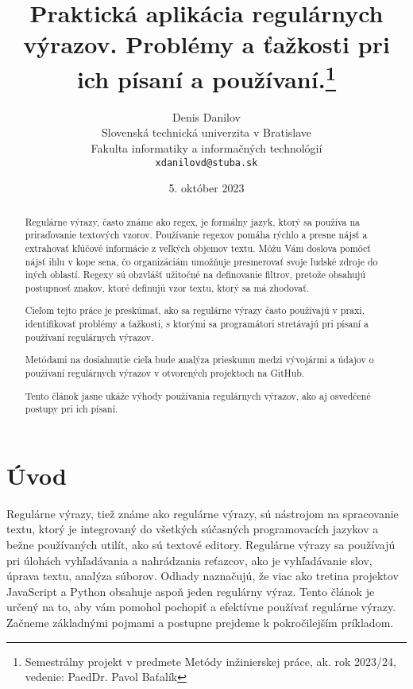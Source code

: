 \documentclass[10pt,twoside,slovak,a4paper]{article}
\title{Praktická aplikácia regulárnych výrazov. Problémy a ťažkosti pri ich písaní a používaní.\thanks{Semestrálny projekt v predmete Metódy inžinierskej práce, ak. rok 2023/24, vedenie: PaedDr. Pavol Baťalík}} %
\author{Denis Danilov\\[2pt]
	{\small Slovenská technická univerzita v Bratislave}\\
	{\small Fakulta informatiky a informačných technológií}\\
	{\small \texttt{xdanilovd@stuba.sk}}
	}
\date{\small 5. október 2023} %
\begin{document}
\maketitle

\begin{abstract}
	Regulárne výrazy, často známe ako regex, je formálny jazyk, ktorý sa používa na priraďovanie textových vzorov. Používanie regexov pomáha rýchlo a presne nájsť a extrahovať kľúčové informácie z veľkých objemov textu. Môžu Vám doslova pomôcť nájsť ihlu v kope sena, čo organizáciám umožňuje presmerovať svoje ľudské zdroje do iných oblastí. Regexy sú obzvlášť užitočné na definovanie filtrov, pretože obsahujú postupnosť znakov, ktoré definujú vzor textu, ktorý sa má zhodovať.
	
	Cieľom tejto práce je preskúmať, ako sa regulárne výrazy často používajú v praxi, identifikovať problémy a ťažkosti, s ktorými sa programátori stretávajú pri písaní a používaní regulárnych výrazov.
	
	Metódami na dosiahnutie cieľa bude analýza prieskumu medzi vývojármi a údajov o používaní regulárnych výrazov v otvorených projektoch na GitHub.
	
	Tento článok jasne ukáže výhody používania regulárnych výrazov, ako aj osvedčené postupy pri ich písaní.

\end{abstract}



\section{Úvod}
	Regulárne výrazy, tiež známe ako regulárne výrazy, sú nástrojom na spracovanie textu, ktorý je integrovaný do všetkých súčasných programovacích jazykov a bežne používaných utilít, ako sú textové editory.
	Regulárne výrazy sa používajú pri úlohách vyhľadávania a nahrádzania reťazcov, ako je vyhľadávanie slov, úprava textu, analýza súborov. \cite{Chapman2017}
	Odhady naznačujú, že viac ako tretina projektov JavaScript a Python obsahuje aspoň jeden regulárny výraz. \cite{Michael2019}
	Tento článok je určený na to, aby vám pomohol pochopiť a efektívne používať regulárne výrazy. 
	Začneme základnými pojmami a postupne prejdeme k pokročilejším príkladom.\\
\end{document}
